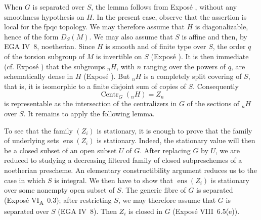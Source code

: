 When \(G\) is separated over \(S\), the lemma follows from Exposé
, without any smoothness hypothesis on \(H\). In the present
case, observe that the assertion is local for the fpqc topology. We
may therefore assume that \(H\) is diagonalizable, hence of the form
\(D_S(M)\). We may also assume that \(S\) is affine and then, by EGA
IV~8, noetherian. Since \(H\) is smooth and of finite type over \(S\),
the order \(q\) of the torsion subgroup of \(M\) is invertible on
\(S\) (Exposé ). It is then immediate (cf. Exposé )
that the subgroups \({}_nH\), with \(n\) ranging over the powers of
\(q\), are schematically dense in \(H\) (Exposé ). But
\({}_nH\) is a completely split covering of \(S\), that is, it is
isomorphic to a finite disjoint sum of copies of \(S\). Consequently
\[
  \operatorname{Centr}_G({}_nH)=Z_n
\]
is representable as the intersection of the centralizers in \(G\) of
the sections of \({}_nH\) over \(S\). It remains to apply the following
lemma.


To see that the family \((Z_i)\) is stationary, it is enough to prove
that the family of underlying sets \(\operatorname{ens}(Z_i)\) is
stationary. Indeed, the stationary value will then be a closed subset
of an open subset \(U\) of \(G\). After replacing \(G\) by \(U\), we
are reduced to studying a decreasing filtered family of closed
subpreschemes of a noetherian prescheme. An elementary constructibility
argument reduces us to the case in which \(S\) is integral. We then
have to show that \(\operatorname{ens}(Z_i)\) is stationary over some
nonempty open subset of \(S\). The generic fibre of \(G\) is separated
(Exposé VI\textsubscript{A}~0.3); after restricting \(S\), we may
therefore assume that \(G\) is separated over \(S\) (EGA IV~8). Then
\(Z_i\) is closed in \(G\) (Exposé VIII~6.5(e)).


